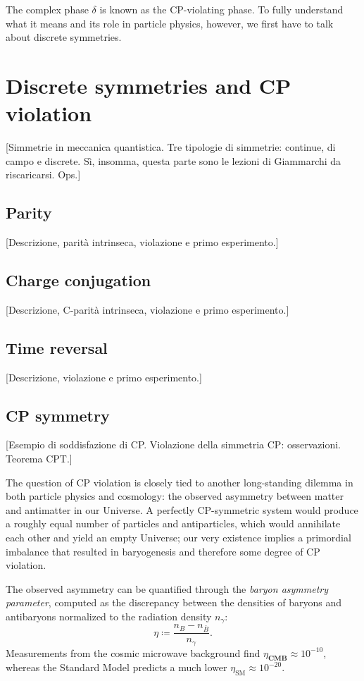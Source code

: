 The complex phase $\delta$ is known as the CP-violating phase. To fully understand what it means and its role in particle physics, however, we first have to talk about discrete symmetries. 

\section{Discrete symmetries and CP violation}
[Simmetrie in meccanica quantistica. Tre tipologie di simmetrie: continue, di campo e discrete. Sì, insomma, questa parte sono le lezioni di Giammarchi da riscaricarsi. Ops.]

\subsection{Parity}
[Descrizione, parità intrinseca, violazione e primo esperimento.]

\subsection{Charge conjugation}
[Descrizione, C-parità intrinseca, violazione e primo esperimento.]

\subsection{Time reversal}
[Descrizione, violazione e primo esperimento.]

\subsection{CP symmetry}
[Esempio di soddisfazione di CP. Violazione della simmetria CP: osservazioni. Teorema CPT.]

The question of CP violation is closely tied to another long-standing dilemma in both particle physics and cosmology: the observed asymmetry between matter and antimatter in our Universe.
A perfectly CP-symmetric system would produce a roughly equal number of particles and antiparticles, which would annihilate each other and yield an empty Universe; our very existence implies a primordial imbalance that resulted in baryogenesis and therefore some degree of CP violation.

The observed asymmetry can be quantified through the \textit{baryon asymmetry parameter}, computed as the discrepancy between the densities of baryons and antibaryons normalized to the radiation density $n_\gamma$:
\begin{equation}
\eta \coloneqq \frac{n_B - n_{\bar{B}}}{n_\gamma}.
\end{equation}
Measurements from the cosmic microwave background
find $\eta_\textbf{CMB} \approx {10}^{-10}$, whereas the Standard Model predicts a much lower $\eta_\text{SM} \approx {10}^{-20}$.

